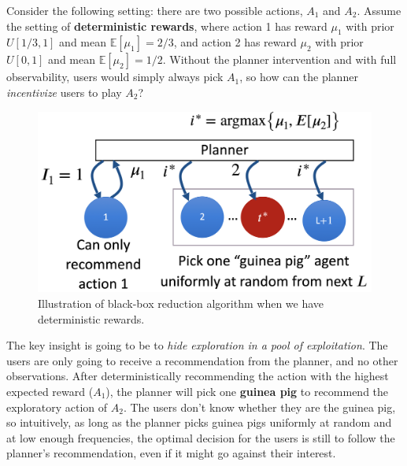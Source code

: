 \documentclass[
  letterpaper,
  DIV=11,
  numbers=noendperiod,
  oneside]{scrreprt}
\theoremstyle{remark}
\begin{document}
Consider the following setting: there are two possible actions, \(A_1\)
and \(A_2\). Assume the setting of \textbf{deterministic rewards}, where
action 1 has reward \(\mu_1\) with prior \(U[1/3, 1]\) and mean
\(\mathbb{E}[\mu_1] = 2/3\), and action 2 has reward \(\mu_2\) with
prior \(U[0, 1]\) and mean \(\mathbb{E}[\mu_2] = 1/2\). Without the
planner intervention and with full observability, users would simply
always pick \(A_1\), so how can the planner \emph{incentivize} users to
play \(A_2\)?

\begin{figure}

{\centering \includegraphics{src/Figures/guinea_pig_fig.png}

}

\caption{Illustration of black-box reduction algorithm when we have
deterministic rewards.}

\end{figure}%

The key insight is going to be to \emph{hide exploration in a pool of
exploitation}. The users are only going to receive a recommendation from
the planner, and no other observations. After deterministically
recommending the action with the highest expected reward (\(A_1\)), the
planner will pick one \textbf{guinea pig} to recommend the exploratory
action of \(A_2\). The users don't know whether they are the guinea pig,
so intuitively, as long as the planner picks guinea pigs uniformly at
random and at low enough frequencies, the optimal decision for the users
is still to follow the planner's recommendation, even if it might go
against their interest.
\end{document}
